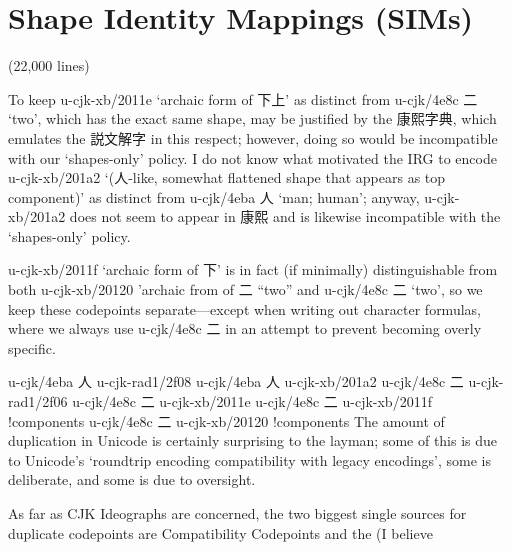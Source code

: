 \section{Shape Identity Mappings (SIMs)
}
\begin{multicols}{2}(22,000 lines)\mktsShowpar\par
To keep u-cjk-xb/2011e { }‘archaic form of {\cjk{}下上}’ as distinct from
u-cjk/4e8c {\cjk{}二} ‘two’, which has the
exact same shape, may be justified by the {\cjk{}康熙字典}, which
emulates the {\cjk{}説文解字} in this respect; however, doing
so would be incompatible with our ‘shapes-only’ policy. I do not know
what motivated the IRG to encode u-cjk-xb/201a2 { }‘({\cjk{}人}-like, somewhat
flattened shape that appears as top component)’ as distinct from u-cjk/4eba {\cjk{}人}
‘man; human’; anyway, u-cjk-xb/201a2 { }does not seem to appear in {\cjk{}康熙} and
is likewise incompatible with the ‘shapes-only’ policy.\mktsShowpar\par
u-cjk-xb/2011f { }‘archaic form of {\cjk{}下}’ is in fact (if minimally)
distinguishable from both u-cjk-xb/20120 { }'archaic from of {\cjk{}二} “two”
and u-cjk/4e8c {\cjk{}二} ‘two’, so we keep these codepoints separate—except
when writing out character formulas, where we always use u-cjk/4e8c {\cjk{}二}
in an attempt to prevent becoming overly specific.\mktsShowpar\par
\begingroup\mktsStyleCode{}\begingroup\mktsObeyAllLines{}u-cjk/4eba	{\cjk{}人}	u-cjk-rad1/2f08	{} 
u-cjk/4eba	{\cjk{}人}	u-cjk-xb/201a2	{} 
u-cjk/4e8c	{\cjk{}二}	u-cjk-rad1/2f06	{} 
u-cjk/4e8c	{\cjk{}二}	u-cjk-xb/2011e	{} 
u-cjk/4e8c	{\cjk{}二}	u-cjk-xb/2011f	{}!components 
u-cjk/4e8c	{\cjk{}二}	u-cjk-xb/20120	{}!components 
\endgroup{}\endgroup{}The amount of duplication in Unicode is certainly surprising to the
layman; some of this is due to Unicode’s ‘roundtrip encoding compatibility
with legacy encodings’, some is deliberate, and some is due to oversight.\mktsShowpar\par
As far as CJK Ideographs are concerned, the two biggest single sources
for duplicate codepoints are Compatibility Codepoints and the (I believe

\end{multicols}
